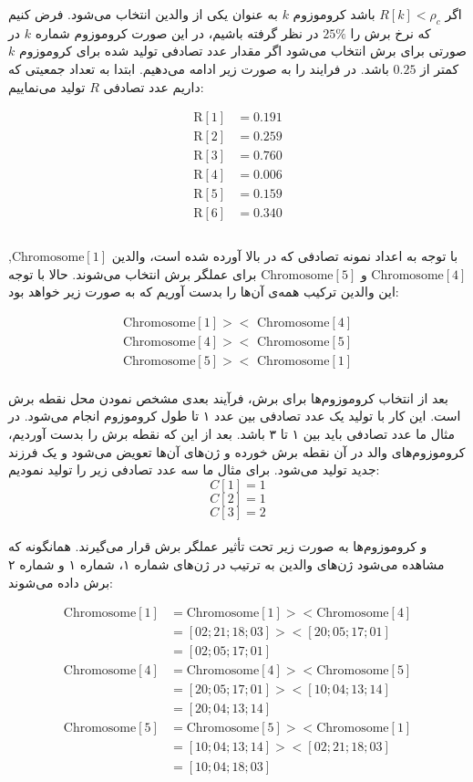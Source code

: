 \documentclass[11pt]{article}
\begin{document}
اگر $R[k] < \rho_c$ باشد کروموزوم $k$ به عنوان یکی از والدین انتخاب می‌شود. فرض کنیم که نرخ برش را $25\%$ در نظر گرفته باشیم، در این صورت کروموزوم شماره $k$ در صورتی برای برش انتخاب می‌شود اگر مقدار عدد تصادفی تولید شده برای کروموزوم $k$ کمتر از $0.25$ باشد. در فرایند را به صورت زیر ادامه می‌دهیم. ابتدا به تعداد جمعیتی که داریم عدد تصادفی $R$ تولید می‌نماییم:

\[
\begin{align*}
\text{R}[1] &= 0.191\\
\text{R}[2] &= 0.259\\
\text{R}[3] &= 0.760\\
\text{R}[4] &= 0.006\\
\text{R}[5] &= 0.159\\
\text{R}[6] &= 0.340\\
\end{align*}
\]
\\

با توجه به اعداد نمونه تصادفی که در بالا آورده شده است، والدین $\text{Chromosome}[1]$, $\text{Chromosome}[4]$ و $\text{Chromosome}[5]$ برای عملگر برش انتخاب می‌شوند. حالا با توجه این والدین ترکیب همه‌ی آن‌ها را بدست آوریم که به صورت زیر خواهد بود:


\begin{align*}
\text{Chromosome}[1]>< \text{ Chromosome}[4] \\
\text{Chromosome}[4]>< \text{ Chromosome}[5] \\
\text{Chromosome}[5]><\text{ Chromosome}[1]\\
\end{align*}

بعد از انتخاب کروموزوم‌ها برای برش، فرآیند بعدی مشخص نمودن محل نقطه برش است. این کار با تولید یک عدد تصادفی بین عدد ۱ تا طول کروموزوم انجام می‌شود. در مثال ما عدد تصادفی باید بین ۱ تا ۳ باشد. بعد از این که نقطه برش را بدست آوردیم، کروموزوم‌های والد در آن نقطه برش خورده و ژن‌های آن‌ها تعویض می‌شود و یک فرزند جدید تولید می‌شود. برای مثال ما سه عدد تصادفی زیر را تولید نمودیم:
\[ C[1] = 1 \]
\[ C[2] = 1 \]
\[ C[3] = 2 \]
\\
و کروموزوم‌ها به صورت زیر تحت تأثیر عملگر برش قرار می‌گیرند. همانگونه که مشاهده می‌شود ژن‌های والدین به ترتیب در ژن‌های شماره ۱، شماره ۱ و شماره ۲ برش داده می‌شوند:

\[
\begin{align*}
\text{Chromosome}[1] &= \text{Chromosome}[1] >< \text{Chromosome}[4] \\
&= [02;21;18;03] >< [20;05;17;01] \\
&= [02;05;17;01] \\
\text{Chromosome}[4] &= \text{Chromosome}[4] >< \text{Chromosome}[5] \\
&= [20;05;17;01] >< [10;04;13;14] \\
&= [20;04;13;14] \\
\text{Chromosome}[5] &= \text{Chromosome}[5] >< \text{Chromosome}[1] \\
&= [10;04;13;14] >< [02;21;18;03] \\
&= [10;04;18;03]
\end{align*}
\]
\\
\end{document}
